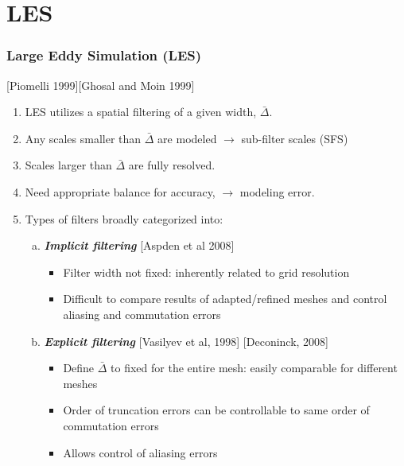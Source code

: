 \documentclass{beamer}
\begin{document}
\section{LES}
\begin{frame}
\frametitle{Large Eddy Simulation (LES)}
\scriptsize
\begin{minipage}[t][1\textheight]{1\textwidth}
[Piomelli 1999][Ghosal and Moin 1999]
\begin{enumerate}[1.]
\scriptsize
\setlength\itemsep{0.3em}
\item LES utilizes a spatial filtering of a given width, $\bar{\Delta} $. 
\item Any scales smaller than  $\bar{\Delta} $  are modeled $\rightarrow$ sub-filter scales (SFS) 
\item Scales larger than $\bar{\Delta}$ are fully resolved.
\item Need appropriate balance for accuracy, $\rightarrow$ modeling error. 
\item Types of filters broadly categorized into:\par
\begin{enumerate}[(a)]
\tiny
\vspace{-2pt}
\item {\scriptsize{\textbf{\textit{Implicit filtering}} {\tiny{[Aspden et al 2008]}}}}
\begin{itemize}

\item Filter width not fixed: inherently related to grid resolution
\item Difficult to compare results of adapted/refined meshes and control aliasing and commutation errors
\end{itemize}

\vspace{-2pt}
\item {\scriptsize{\textbf{\textit{Explicit filtering}} {\tiny{[Vasilyev et al, 1998] [Deconinck, 2008]}}}}
\begin{itemize}

\item Define $\bar{\Delta} $ to fixed for the entire mesh: easily comparable for different meshes
\item Order of truncation errors can be controllable to same order of commutation errors
\item Allows control of aliasing errors
\end{itemize}

\end{enumerate}

\end{enumerate}
\end{minipage}

\end{frame}
\end{document}

